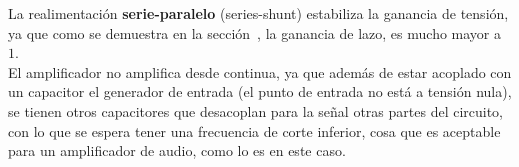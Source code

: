 La realimentación \textbf{serie-paralelo} (series-shunt) estabiliza la ganancia de tensión, ya que como se demuestra en la sección~, la ganancia de lazo, es mucho mayor a $1$.\\

El amplificador no amplifica desde continua, ya que además de estar acoplado con un capacitor el generador de entrada (el punto de entrada no está a tensión nula), se tienen otros capacitores que desacoplan para la señal otras partes del circuito, con lo que se espera tener una frecuencia de corte inferior, cosa que es aceptable para un amplificador de audio, como lo es en este caso.




\normalfont

